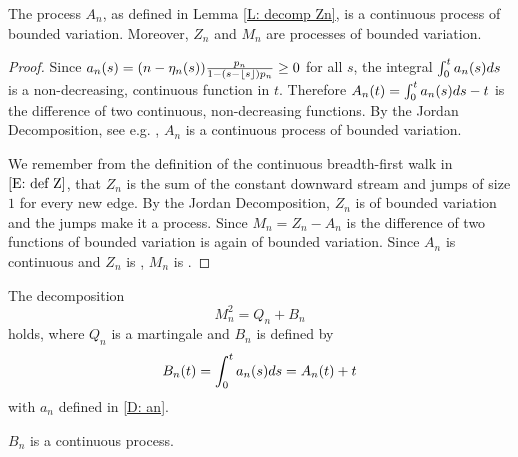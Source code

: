\begin{corollary}
	The process $A_n$, as defined in Lemma \ref{L: decomp Zn}, is a continuous process of bounded variation.
	Moreover, $Z_n$ and $M_n$ are \cadlaq{} processes of bounded variation.
\end{corollary}

\begin{proof}
	Since $a_n(s) = (n - \eta_n(s)) \frac{p_n}{1-(s-\lfloor s\rfloor)p_n} \geq 0$ for all $s$,
	the integral $\int_{0}^{t}a_n(s)ds$ is a non-decreasing, continuous function in $t$.
	Therefore $A_n(t) = \int_{0}^{t}a_n(s)ds -t$ is the difference of two continuous, non-decreasing functions.
	By the Jordan Decomposition, see e.g. \cite{Mikosch2009}, $A_n$ is a continuous process of bounded variation.
	
	We remember from the definition of the continuous breadth-first walk in $\eqref{E: def Z}$,
	that $Z_n$ is the sum of the constant downward stream and jumps of size $1$ for every new edge.
	By the Jordan Decomposition, $Z_n$ is of bounded variation and the jumps make it a \cadlaq{} process.
	Since $M_n = Z_n - A_n$ is the difference of two functions of bounded variation is again of bounded variation.
	Since $A_n$ is continuous and $Z_n$ is \cadlaq{}, $M_n$ is \cadlaq{}.
\end{proof}



\begin{lemma} \label{L: decomp Mn}
	The decomposition
	\begin{equation} \label{E: decomp Mn}
	M_n^2 = Q_n + B_n
	\end{equation}
	holds, where $Q_n$ is a martingale and $B_n$ is defined by 
	\begin{equation} \label{D: Bn}
	B_n(t) = \int_{0}^{t} a_n(s)ds = A_n(t) + t
	\end{equation}
	with $a_n$ defined in \eqref{D: an}.
\end{lemma}
\begin{note} \label{N: decomp Mn}
	$B_n$ is a continuous process.
\end{note}

